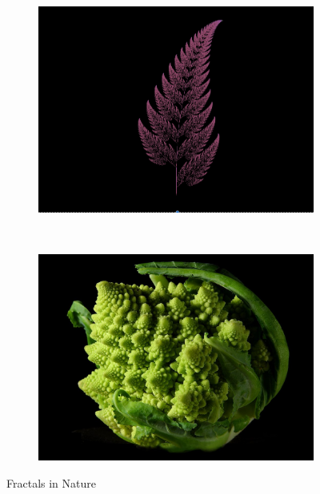 \begin{figure}
        \centering
        \begin{subfigure}[b]{0.4\textwidth}
                \includegraphics[width=\textwidth]{img/Theory/Fractals/Leaf.png}
                
                \label{fig:gull}
        \end{subfigure}%
        ~ %
        \begin{subfigure}[b]{0.4\textwidth}
                \includegraphics[width=\textwidth]{img/Theory/Fractals/Fractal_Broccoli.jpg}
                
                \label{fig:tiger}
        \end{subfigure}
        \caption{Fractals in Nature}\label{fig:NFractals}
\end{figure}




